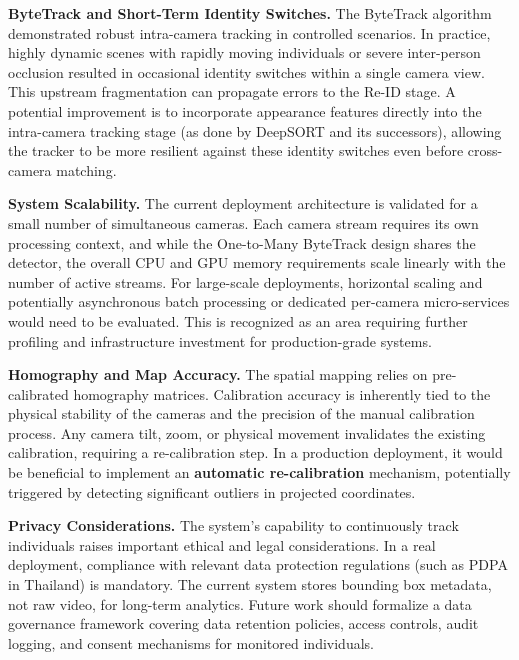 \textbf{ByteTrack and Short-Term Identity Switches.}
The ByteTrack algorithm demonstrated robust intra-camera tracking in controlled scenarios. In practice, highly dynamic scenes with rapidly moving individuals or severe inter-person occlusion resulted in occasional identity switches within a single camera view. This upstream fragmentation can propagate errors to the Re-ID stage. A potential improvement is to incorporate appearance features directly into the intra-camera tracking stage (as done by DeepSORT and its successors), allowing the tracker to be more resilient against these identity switches even before cross-camera matching.

\textbf{System Scalability.}
The current deployment architecture is validated for a small number of simultaneous cameras. Each camera stream requires its own processing context, and while the One-to-Many ByteTrack design shares the detector, the overall CPU and GPU memory requirements scale linearly with the number of active streams. For large-scale deployments, horizontal scaling and potentially asynchronous batch processing or dedicated per-camera micro-services would need to be evaluated. This is recognized as an area requiring further profiling and infrastructure investment for production-grade systems.

\textbf{Homography and Map Accuracy.}
The spatial mapping relies on pre-calibrated homography matrices. Calibration accuracy is inherently tied to the physical stability of the cameras and the precision of the manual calibration process. Any camera tilt, zoom, or physical movement invalidates the existing calibration, requiring a re-calibration step. In a production deployment, it would be beneficial to implement an \textbf{automatic re-calibration} mechanism, potentially triggered by detecting significant outliers in projected coordinates.

\textbf{Privacy Considerations.}
The system's capability to continuously track individuals raises important ethical and legal considerations. In a real deployment, compliance with relevant data protection regulations (such as PDPA in Thailand) is mandatory. The current system stores bounding box metadata, not raw video, for long-term analytics. Future work should formalize a data governance framework covering data retention policies, access controls, audit logging, and consent mechanisms for monitored individuals.